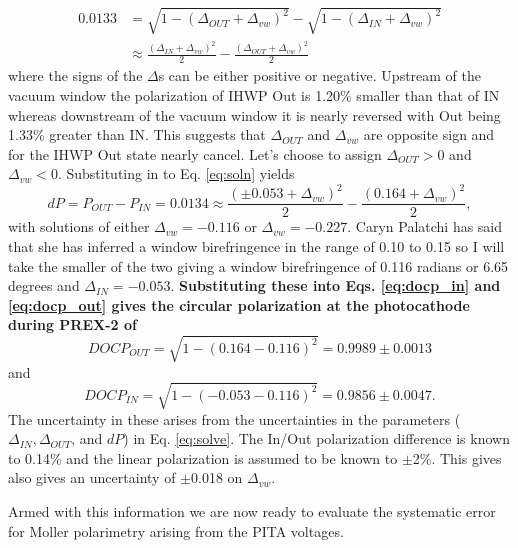 \documentclass[12pt]{article}
\begin{document}
\begin{equation}
\label{eq:soln}
\begin{split}
0.0133&=\sqrt{1-(\Delta_{OUT}+\Delta_{vw})^2}-\sqrt{1-(\Delta_{IN}+\Delta_{vw})^2}\\
~&\approx\frac{\left(\Delta_{IN}+\Delta_{vw}\right)^2}{2}-\frac{\left(\Delta_{OUT}+\Delta_{vw}\right)^2}{2}
\end{split}
\end{equation}
where the signs of the $\Delta$s can be either positive or negative. Upstream of the vacuum window the polarization of IHWP Out is 1.20\% smaller than that of IN whereas downstream of the vacuum window it is nearly reversed with Out being 1.33\% greater than IN.  This suggests that $\Delta_{OUT}$ and $\Delta_{vw}$ are opposite sign and for the IHWP Out state nearly cancel.  Let's choose to assign $\Delta_{OUT}>0$ and $\Delta_{vw}<0$. Substituting in to Eq. \ref{eq:soln} yields
\begin{equation}
\label{eq:solve}
dP=P_{OUT}-P_{IN}=0.0134 \approx \frac{\left(\pm0.053+\Delta_{vw}\right)^2}{2}-\frac{\left(0.164+\Delta_{vw}\right)^2}{2},
\end{equation}
with solutions of either $\Delta_{vw}=-0.116$ or $\Delta_{vw}=-0.227$. Caryn Palatchi has said that she has inferred a window birefringence in the range of 0.10 to 0.15 so I will take the smaller of the two giving a window birefringence of 0.116 radians or 6.65 degrees and $\Delta_{IN}=-0.053$.  \textbf{Substituting these into Eqs. \ref{eq:docp_in} and \ref{eq:docp_out}  gives the circular polarization at the photocathode during PREX-2 of }
\begin{equation}
\label{eq:out}
DOCP_{OUT}=\sqrt{1-(0.164-0.116)^2}=0.9989\pm0.0013
\end{equation}
 and
 \begin{equation}
\label{eq:in}
DOCP_{IN}=\sqrt{1-(-0.053-0.116)^2}=0.9856\pm0.0047.
 \end{equation}
The uncertainty in these arises from the uncertainties in the parameters ($\Delta_{IN}, \Delta_{OUT}$, and $dP$) in Eq. \ref{eq:solve}. The In/Out polarization difference is known to 0.14\% and the linear polarization is assumed to be known to $\pm$2\%. This gives also gives an uncertainty of $\pm$0.018 on $\Delta_{vw}$.

Armed with this information we are now ready to evaluate the systematic error for Moller polarimetry arising from the PITA voltages.
\end{document}
